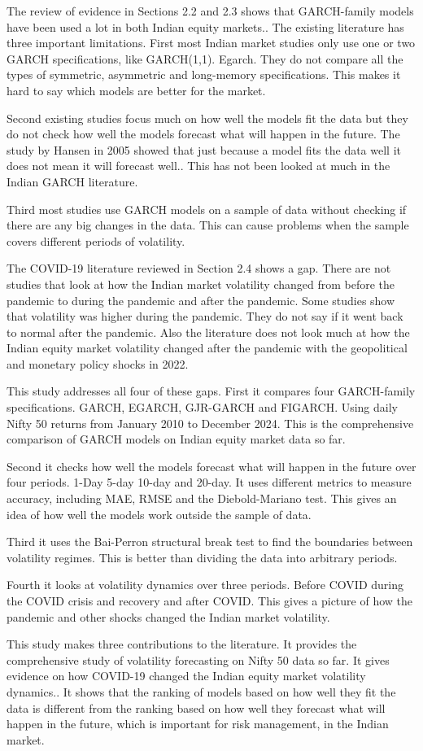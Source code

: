 The review of evidence in Sections 2.2 and 2.3 shows that GARCH-family models have been used a lot in both Indian equity markets.. The existing literature has three important limitations. First most Indian market studies only use one or two GARCH specifications, like GARCH(1,1). Egarch. They do not compare all the types of symmetric, asymmetric and long-memory specifications. This makes it hard to say which models are better for the market.

Second existing studies focus much on how well the models fit the data but they do not check how well the models forecast what will happen in the future. The study by Hansen in 2005 showed that just because a model fits the data well it does not mean it will forecast well.. This has not been looked at much in the Indian GARCH literature.

Third most studies use GARCH models on a sample of data without checking if there are any big changes in the data. This can cause problems when the sample covers different periods of volatility.

The COVID-19 literature reviewed in Section 2.4 shows a gap. There are not studies that look at how the Indian market volatility changed from before the pandemic to during the pandemic and after the pandemic. Some studies show that volatility was higher during the pandemic. They do not say if it went back to normal after the pandemic. Also the literature does not look much at how the Indian equity market volatility changed after the pandemic with the geopolitical and monetary policy shocks in 2022.

This study addresses all four of these gaps. First it compares four GARCH-family specifications. GARCH, EGARCH, GJR-GARCH and FIGARCH. Using daily Nifty 50 returns from January 2010 to December 2024. This is the comprehensive comparison of GARCH models on Indian equity market data so far.

Second it checks how well the models forecast what will happen in the future over four periods. 1-Day 5-day 10-day and 20-day. It uses different metrics to measure accuracy, including MAE, RMSE and the Diebold-Mariano test. This gives an idea of how well the models work outside the sample of data.

Third it uses the Bai-Perron structural break test to find the boundaries between volatility regimes. This is better than dividing the data into arbitrary periods.

Fourth it looks at volatility dynamics over three periods. Before COVID during the COVID crisis and recovery and after COVID. This gives a picture of how the pandemic and other shocks changed the Indian market volatility.

This study makes three contributions to the literature. It provides the comprehensive study of volatility forecasting on Nifty 50 data so far. It gives evidence on how COVID-19 changed the Indian equity market volatility dynamics.. It shows that the ranking of models based on how well they fit the data is different from the ranking based on how well they forecast what will happen in the future, which is important for risk management, in the Indian market.

